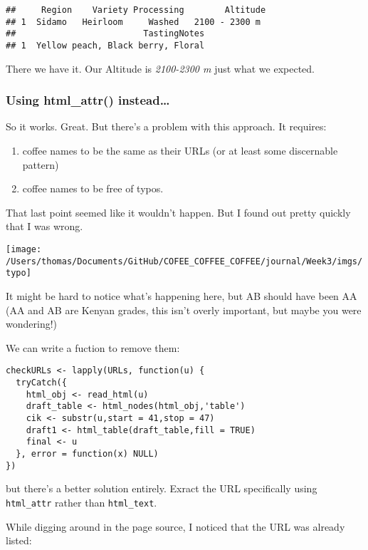 \documentclass[]{article}
\providecommand{\tightlist}{%
  \setlength{\itemsep}{0pt}\setlength{\parskip}{0pt}}
\begin{document}
\begin{verbatim}
##     Region    Variety Processing        Altitude
## 1  Sidamo   Heirloom     Washed   2100 - 2300 m 
##                         TastingNotes
## 1  Yellow peach, Black berry, Floral
\end{verbatim}

There we have it. Our Altitude is \emph{2100-2300 m} just what we
expected.

\hypertarget{using-html_attr-instead}{%
\subsubsection{Using html\_attr()
instead\ldots{}}\label{using-html_attr-instead}}

So it works. Great. But there's a problem with this approach. It
requires:

\begin{enumerate}
\def\labelenumi{\arabic{enumi})}
\tightlist
\item
  coffee names to be the same as their URLs (or at least some
  discernable pattern)
\item
  coffee names to be free of typos.
\end{enumerate}

That last point seemed like it wouldn't happen. But I found out pretty
quickly that I was wrong.

\texttt{[image: /Users/thomas/Documents/GitHub/COFEE\_COFFEE\_COFFEE/journal/Week3/imgs/typo]}

It might be hard to notice what's happening here, but AB should have
been AA (AA and AB are Kenyan grades, this isn't overly important, but
maybe you were wondering!)

We can write a fuction to remove them:

\begin{verbatim}
checkURLs <- lapply(URLs, function(u) {
  tryCatch({
    html_obj <- read_html(u)
    draft_table <- html_nodes(html_obj,'table')
    cik <- substr(u,start = 41,stop = 47)
    draft1 <- html_table(draft_table,fill = TRUE)
    final <- u
  }, error = function(x) NULL)
})
\end{verbatim}

but there's a better solution entirely. Exract the URL specifically
using \texttt{html\_attr} rather than \texttt{html\_text}.

While digging around in the page source, I noticed that the URL was
already listed:
\end{document}
